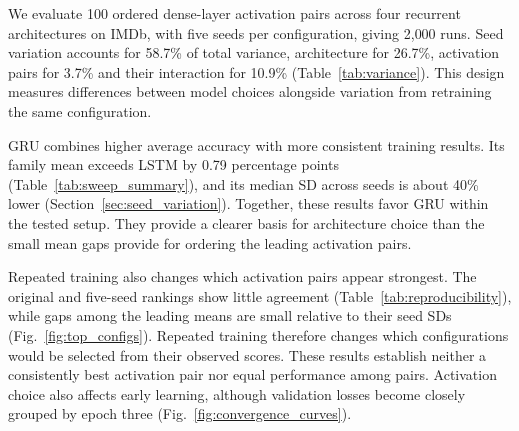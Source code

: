 \documentclass[conference,a4paper]{IEEEtran}
\begin{document}
We evaluate 100 ordered dense-layer activation pairs across
four recurrent architectures on IMDb, with five seeds per
configuration, giving 2{,}000 runs. Seed variation accounts for 58.7\% of
total variance, architecture for 26.7\%, activation pairs for
3.7\% and their interaction for 10.9\%
(Table~\ref{tab:variance}). This design measures differences between model choices
alongside variation from retraining the same configuration.

GRU combines higher average accuracy with more consistent
training results. Its family mean exceeds LSTM by 0.79
percentage points (Table~\ref{tab:sweep_summary}), and its
median SD across seeds is about 40\% lower
(Section~\ref{sec:seed_variation}). Together, these results
favor GRU within the tested setup. They provide a clearer
basis for architecture choice than the small mean gaps
provide for ordering the leading activation pairs.

Repeated training also changes which activation pairs appear
strongest. The original and five-seed rankings show little
agreement (Table~\ref{tab:reproducibility}), while gaps among
the leading means are small relative to their seed SDs
(Fig.~\ref{fig:top_configs}). Repeated training therefore changes which configurations
would be selected from their observed scores. These results establish
neither a consistently best activation pair nor equal
performance among pairs. Activation choice also affects
early learning, although validation losses become closely
grouped by epoch three (Fig.~\ref{fig:convergence_curves}).
\end{document}

